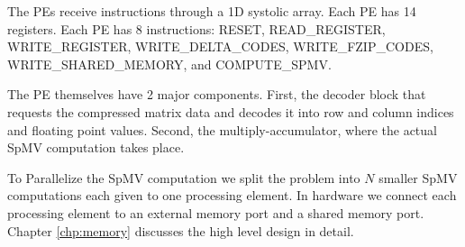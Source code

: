 The PEs receive instructions through a 1D systolic array. Each PE has 14 registers. Each PE has 8 instructions: RESET, READ\_REGISTER, WRITE\_REGISTER, WRITE\_DELTA\_CODES, WRITE\_FZIP\_CODES, WRITE\_SHARED\_MEMORY, and COMPUTE\_SPMV.

The PE themselves have 2 major components. First, the decoder block that requests the compressed matrix data and decodes it into row and column indices and floating point values. Second, the multiply-accumulator, where the actual SpMV computation takes place.

To Parallelize the SpMV computation we split the problem into $N$ smaller SpMV computations each given to one processing element. In hardware we connect each processing element to an external memory port and a shared memory port. Chapter \ref{chp:memory} discusses the high level design in detail.
